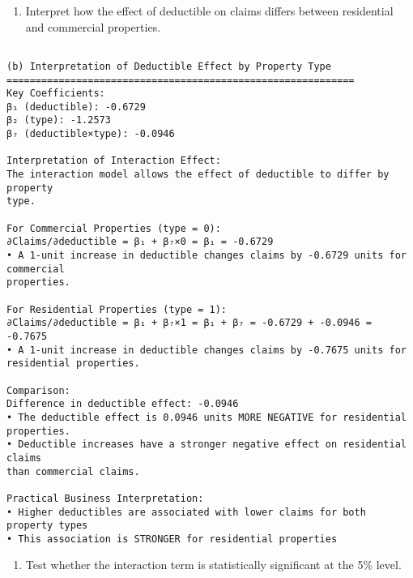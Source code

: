 \documentclass[8pt, twocolumn]{extarticle}
\providecommand{\tightlist}{%
      \setlength{\itemsep}{0pt}\setlength{\parskip}{0pt}}
\begin{document}
    \begin{enumerate}
\def\labelenumi{(\alph{enumi})}
\setcounter{enumi}{1}
\tightlist
\item
  Interpret how the effect of deductible on claims differs between
  residential and commercial properties.
\end{enumerate}

    \begin{Verbatim}[commandchars=\\\{\}]

(b) Interpretation of Deductible Effect by Property Type
============================================================
Key Coefficients:
β₁ (deductible): -0.6729
β₂ (type): -1.2573
β₇ (deductible×type): -0.0946

Interpretation of Interaction Effect:
The interaction model allows the effect of deductible to differ by property
type.

For Commercial Properties (type = 0):
∂Claims/∂deductible = β₁ + β₇×0 = β₁ = -0.6729
• A 1-unit increase in deductible changes claims by -0.6729 units for commercial
properties.

For Residential Properties (type = 1):
∂Claims/∂deductible = β₁ + β₇×1 = β₁ + β₇ = -0.6729 + -0.0946 = -0.7675
• A 1-unit increase in deductible changes claims by -0.7675 units for
residential properties.

Comparison:
Difference in deductible effect: -0.0946
• The deductible effect is 0.0946 units MORE NEGATIVE for residential
properties.
• Deductible increases have a stronger negative effect on residential claims
than commercial claims.

Practical Business Interpretation:
• Higher deductibles are associated with lower claims for both property types
• This association is STRONGER for residential properties
    \end{Verbatim}

    \begin{enumerate}
\def\labelenumi{(\alph{enumi})}
\setcounter{enumi}{2}
\tightlist
\item
  Test whether the interaction term is statistically significant at the
  5\% level.
\end{enumerate}
\end{document}
